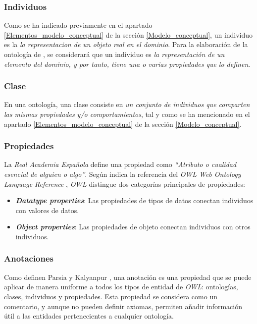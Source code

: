 \subsubsection{Individuos}
Como se ha indicado previamente en el apartado \ref*{Elementos_modelo_conceptual} de la sección \ref*{Modelo_conceptual}, 
un individuo es la \textit{la representacion de un objeto real en el dominio}. Para la elaboración de la ontología de 
\anima, se considerará que un individuo es \textit{la representación de un elemento del dominio, y por tanto, 
tiene una o varias propiedades que lo definen}.

\subsubsection{Clase}
En una ontología, una clase consiste en \textit{un conjunto de individuos que comparten las mismas propiedades y/o 
comportamientos}, tal y como se ha mencionado en el apartado \ref*{Elementos_modelo_conceptual} 
de la sección \ref*{Modelo_conceptual}.

\subsubsection{Propiedades}
La \textit{Real Academia Española} \autocite*{propiedadRAE} define una propiedad como 
\textit{“Atributo o cualidad esencial de alguien o algo”}. Según indica la referencia del 
\textit{OWL Web Ontology Language Reference} \autocite*{Bechhofer2004a}, \textit{OWL} distingue 
dos categorías principales de propiedades:

\begin{itemize}
    \item \textit{\textbf{Datatype properties}}: Las propiedades de tipos de datos conectan individuos con valores de datos.
    \item \textit{\textbf{Object properties}}: Las propiedades de objeto conectan individuos con otros individuos.
\end{itemize}

\subsubsection{Anotaciones}
Como definen Parsia y Kalyanpur \autocite*{Parsia2004}, una anotación es una propiedad que se puede aplicar de manera uniforme a todos los tipos de entidad 
de \textit{OWL}: ontologías, clases, individuos y propiedades. Esta propiedad se considera como un 
comentario, y aunque no pueden definir axiomas, permiten añadir información útil a las entidades pertenecientes 
a cualquier ontología. \medskip

